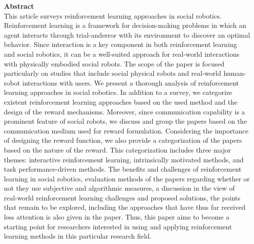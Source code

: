 \documentclass[report.tex]{subfiles}
\begin{document}
\noindent\textbf{Abstract} \\
This article surveys reinforcement learning approaches in social robotics. Reinforcement learning is a framework for decision-making problems in which an agent interacts through trial-anderror with its environment to discover an optimal behavior. Since interaction is a key component in both reinforcement learning and social robotics, it can be a well-suited approach for real-world interactions with physically embodied social robots. The scope of the paper is focused particularly on studies that include social physical robots and real-world human-robot interactions with users. We present a thorough analysis of reinforcement learning approaches in social robotics. In addition to a survey, we categorize existent reinforcement learning approaches based on the used method and the design of the reward mechanisms. Moreover, since communication capability is a prominent feature of social robots, we discuss and group the papers based on the communication medium used for reward formulation. Considering the importance of designing the reward function, we also provide a categorization of the papers based on the nature of the reward. This categorization includes three major themes: interactive reinforcement learning, intrinsically motivated methods, and task performance-driven methods. The benefits and challenges of reinforcement learning in social robotics, evaluation methods of the papers regarding whether or not they use subjective and algorithmic measures, a discussion in the view of real-world reinforcement learning challenges and proposed solutions, the points that remain to be explored, including the approaches that have thus far received less attention is also given in the paper. Thus, this paper aims to become a starting point for researchers interested in using and applying reinforcement learning methods in this particular research field.
\\
\end{document}
